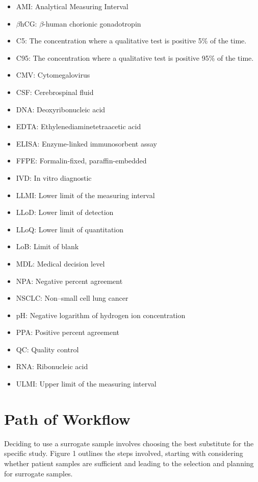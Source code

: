 \documentclass{article}
\begin{document}
\begin{itemize}
    \item AMI: Analytical Measuring Interval
    \item $\beta$hCG: $\beta$-human chorionic gonadotropin
    \item C5: The concentration where a qualitative test is positive 5\% of the time.
    \item C95: The concentration where a qualitative test is positive 95\% of the time.
    \item CMV: Cytomegalovirus
    \item CSF: Cerebrospinal fluid
    \item DNA: Deoxyribonucleic acid
    \item EDTA: Ethylenediaminetetraacetic acid
    \item ELISA: Enzyme-linked immunosorbent assay
    \item FFPE: Formalin-fixed, paraffin-embedded
    \item IVD: In vitro diagnostic
    \item LLMI: Lower limit of the measuring interval
    \item LLoD: Lower limit of detection
    \item LLoQ: Lower limit of quantitation
    \item LoB: Limit of blank
    \item MDL: Medical decision level
    \item NPA: Negative percent agreement
    \item NSCLC: Non–small cell lung cancer
    \item pH: Negative logarithm of hydrogen ion concentration
    \item PPA: Positive percent agreement
    \item QC: Quality control
    \item RNA: Ribonucleic acid
    \item ULMI: Upper limit of the measuring interval
\end{itemize}

\section{Path of Workflow}

Deciding to use a surrogate sample involves choosing the best substitute for the specific study. Figure 1 outlines the steps involved, starting with considering whether patient samples are sufficient and leading to the selection and planning for surrogate samples.
\end{document}
